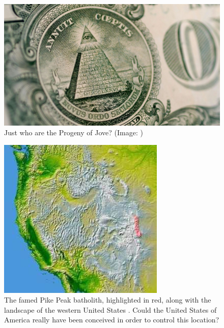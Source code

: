 \documentclass[10pt,twocolumn,letterpaper]{article}
\begin{document}
\begin{figure}[h]
\begin{center}
   \includegraphics[width=1\linewidth]{illuminati.jpg}
\end{center}
   \caption{Just who are the Progeny of Jove? (Image: \cite{35})}
\label{fig:10}
\label{fig:onecol}
\end{figure}

\begin{figure}[t]
\begin{center}
   \includegraphics[width=1\linewidth]{pike.jpg}
\end{center}
   \caption{The famed Pike Peak batholith, highlighted in red, along with the landscape of the western United States \cite{36}. Could the United States of America really have been conceived in order to control this location?}
\label{fig:11}
\label{fig:onecol}
\end{figure}
\end{document}
